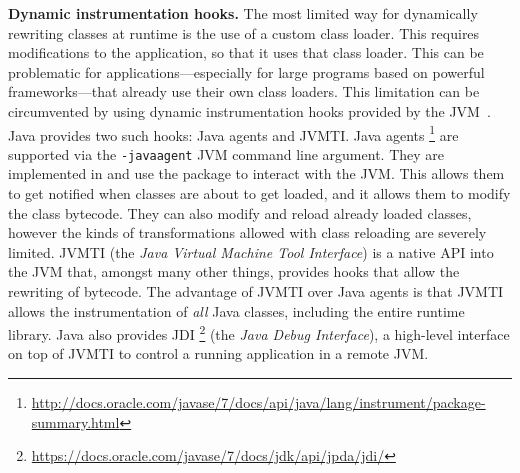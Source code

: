 \textbf{Dynamic instrumentation hooks.}
The most limited way for dynamically rewriting \java{} classes at runtime
is the use of a custom class loader.
This requires modifications to the application,
so that it uses that class loader.
This can be problematic for applications---especially for large programs
based on powerful frameworks---that already use their own class loaders.
This limitation can be circumvented by using dynamic instrumentation
hooks provided by the JVM~\cite{lindholmJavaVirtualMachine}.
Java provides two such hooks: Java agents and JVMTI.
Java agents%
\footnote{\url{http://docs.oracle.com/javase/7/docs/api/java/lang/instrument/package-summary.html}} 
are supported via the \texttt{-javaagent} JVM command line argument.
They are implemented in \java{} and use the  package to interact with the JVM.
This allows them to get notified when classes are about to get loaded,
and it allows them to modify the class bytecode.
They can also modify and reload already loaded classes,
however the kinds of transformations allowed with class reloading are severely limited.
JVMTI (the \emph{Java Virtual Machine Tool Interface}) is a native API into the JVM that, 
amongst many other things, provides hooks that allow the
rewriting of bytecode.
The advantage of JVMTI over Java agents is that JVMTI allows the instrumentation of \emph{all} Java classes, including the entire runtime library.
Java also provides JDI%
\footnote{\url{https://docs.oracle.com/javase/7/docs/jdk/api/jpda/jdi/}}
(the \emph{Java Debug Interface}), 
a high-level interface on top of JVMTI to control a running application in a remote JVM.

